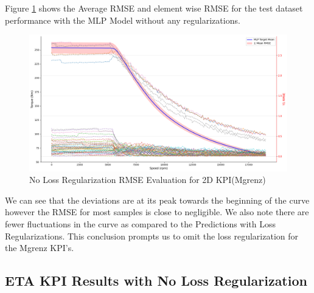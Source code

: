 \documentclass{report} %
\begin{document}
Figure \ref{fig:No Loss Regularization RMSE Evaluation for 2D KPI(Mgrenz)} shows the Average \ac{RMSE} and element wise \ac{RMSE} for the test dataset performance with the MLP Model without any regularizations.\\

\begin{figure}[H]
    \centering
    \includegraphics[width=1\textwidth]{./ReportImages/RMSE_MLP_no_lossreg_y1.png} 
    \caption{No Loss Regularization \ac{RMSE} Evaluation for 2D KPI(Mgrenz)} 
    \label{fig:No Loss Regularization RMSE Evaluation for 2D KPI(Mgrenz)}
\end{figure}

We can see that the deviations are at its peak towards the beginning of the curve however the \ac{RMSE} for most samples is close to negligible.
We also note there are fewer fluctuations in the curve as compared to the Predictions with Loss Regularizations.
This conclusion prompts us to omit the loss regularization for the Mgrenz \ac{KPI}'s.\\

\subsection{ETA \ac{KPI} Results with No Loss Regularization}\label{subsec:3D ETA Results with No Loss Regularization}
\end{document}
